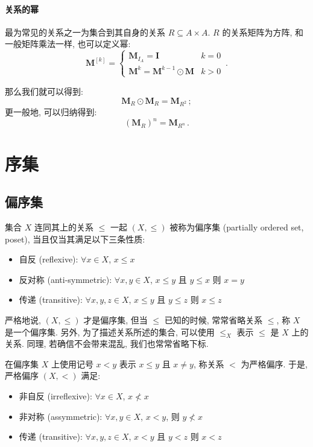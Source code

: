 \documentclass[UTF8]{ctexart}
\theoremstyle{mystyle}
\theoremstyle{myremark}
\theoremstyle{plain}
\newcommand{\ve}[1]{\boldsymbol{\mathbf{#1}}}
\begin{document}
\paragraph{关系的幂}
最为常见的关系之一为集合到其自身的关系 $ R \subseteq A \times A $. $ R $ 的关系矩阵为方阵, 和一般矩阵乘法一样, 也可以定义幂:
\[ \ve M^{[k]} = \begin{cases}
    \ve M_{I_A} = \ve I  & k = 0 \\
    \ve M^k = \ve M^{k - 1} \odot \ve M & k > 0
\end{cases} \,.\]

那么我们就可以得到:
\[ 
    \ve M_R \odot \ve M_R = \ve M_{R^2} \,;
\]
更一般地, 可以归纳得到:
\[ 
    (\ve M_R)^n = \ve M_{R^n} \,.
\]

\section{序集}
\subsection{偏序集}
\begin{definition}
    集合 $ X $ 连同其上的关系 $ \le $ 一起 $ (X, \le) $ 被称为偏序集 (partially ordered set, poset), 当且仅当其满足以下三条性质:
    \begin{itemize}
        \item 自反 (reflexive): $ \forall x \in X $, $ x \le x $
        \item 反对称 (anti-symmetric): $ \forall x, y \in X $, $ x \le y $ 且 $ y \le x $ 则 $ x = y $
        \item 传递 (transitive): $ \forall x, y, z \in X $, $ x \le y $ 且 $ y \le z $ 则 $ x \le z $
    \end{itemize}
\end{definition}

严格地说, $ (X, \le) $ 才是偏序集, 但当 $ \le $ 已知的时候, 常常省略关系 $ \le $, 称 $ X $ 是一个偏序集. 另外, 为了描述关系所述的集合, 可以使用 $ \le_X $ 表示 $ \le $ 是 $ X $ 上的关系. 同理, 若确信不会带来混乱, 我们也常常省略下标.


\begin{definition}
    在偏序集 $ X $ 上使用记号 $ x < y $ 表示 $ x \le y $ 且 $ x \neq y $, 称关系 $ < $ 为严格偏序. 于是, 严格偏序 $ (X, <) $ 满足:
    \begin{itemize}
        \item 非自反 (irreflexive): $ \forall x \in X $, $ x \not < x $
        \item 非对称 (assymmetric): $ \forall x, y \in X $, $ x < y $, 则 $ y \not < x $
        \item 传递 (transitive): $ \forall x, y, z \in X $, $ x < y $ 且 $ y < z $ 则 $ x < z $
    \end{itemize}
\end{definition}
\end{document}
